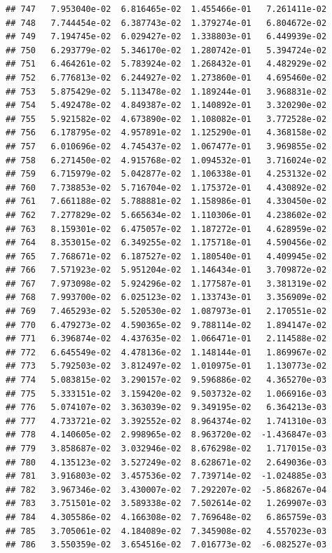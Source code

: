 \documentclass[
]{article}
\begin{document}
\begin{verbatim}
## 747   7.953040e-02  6.816465e-02  1.455466e-01   7.261411e-02
## 748   7.744454e-02  6.387743e-02  1.379274e-01   6.804672e-02
## 749   7.194745e-02  6.029427e-02  1.338803e-01   6.449939e-02
## 750   6.293779e-02  5.346170e-02  1.280742e-01   5.394724e-02
## 751   6.464261e-02  5.783924e-02  1.268432e-01   4.482929e-02
## 752   6.776813e-02  6.244927e-02  1.273860e-01   4.695460e-02
## 753   5.875429e-02  5.113478e-02  1.189244e-01   3.968831e-02
## 754   5.492478e-02  4.849387e-02  1.140892e-01   3.320290e-02
## 755   5.921582e-02  4.673890e-02  1.108082e-01   3.772528e-02
## 756   6.178795e-02  4.957891e-02  1.125290e-01   4.368158e-02
## 757   6.010696e-02  4.745437e-02  1.067477e-01   3.969855e-02
## 758   6.271450e-02  4.915768e-02  1.094532e-01   3.716024e-02
## 759   6.715979e-02  5.042877e-02  1.106338e-01   4.253132e-02
## 760   7.738853e-02  5.716704e-02  1.175372e-01   4.430892e-02
## 761   7.661188e-02  5.788881e-02  1.158986e-01   4.330450e-02
## 762   7.277829e-02  5.665634e-02  1.110306e-01   4.238602e-02
## 763   8.159301e-02  6.475057e-02  1.187272e-01   4.628959e-02
## 764   8.353015e-02  6.349255e-02  1.175718e-01   4.590456e-02
## 765   7.768671e-02  6.187527e-02  1.180540e-01   4.409945e-02
## 766   7.571923e-02  5.951204e-02  1.146434e-01   3.709872e-02
## 767   7.973098e-02  5.924296e-02  1.177587e-01   3.381319e-02
## 768   7.993700e-02  6.025123e-02  1.133743e-01   3.356909e-02
## 769   7.465293e-02  5.520530e-02  1.087973e-01   2.170551e-02
## 770   6.479273e-02  4.590365e-02  9.788114e-02   1.894147e-02
## 771   6.396874e-02  4.437635e-02  1.066471e-01   2.114588e-02
## 772   6.645549e-02  4.478136e-02  1.148144e-01   1.869967e-02
## 773   5.792503e-02  3.812497e-02  1.010975e-01   1.130773e-02
## 774   5.083815e-02  3.290157e-02  9.596886e-02   4.365270e-03
## 775   5.333151e-02  3.159420e-02  9.503732e-02   1.066916e-03
## 776   5.074107e-02  3.363039e-02  9.349195e-02   6.364213e-03
## 777   4.733721e-02  3.392552e-02  8.964374e-02   1.741310e-03
## 778   4.140605e-02  2.998965e-02  8.963720e-02  -1.436847e-03
## 779   3.858687e-02  3.032946e-02  8.676298e-02   1.717015e-03
## 780   4.135123e-02  3.527249e-02  8.628671e-02   2.649036e-03
## 781   3.916803e-02  3.457536e-02  7.739714e-02  -1.024885e-03
## 782   3.967346e-02  3.430007e-02  7.292207e-02  -5.868267e-04
## 783   3.751501e-02  3.589338e-02  7.502614e-02   1.269907e-03
## 784   4.305586e-02  4.166308e-02  7.769648e-02   6.865759e-03
## 785   3.705061e-02  4.184089e-02  7.345908e-02   4.557023e-03
## 786   3.550359e-02  3.654516e-02  7.016773e-02  -6.082527e-03

\end{verbatim}
\end{document}
